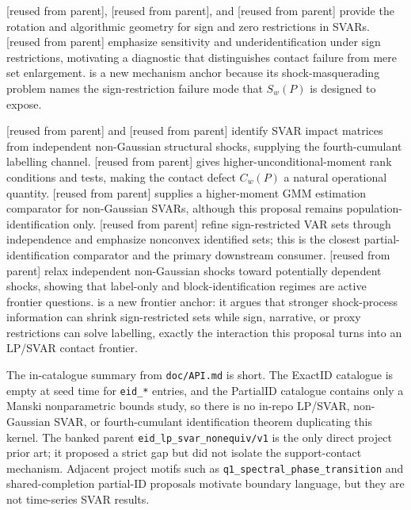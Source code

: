 \documentclass[11pt]{article}
\theoremstyle{definition}
\theoremstyle{plain}
\theoremstyle{remark}
\begin{document}
\citet{RubioRamirezWaggonerZha2010} [reused from parent], \citet{AriasRubioRamirezWaggoner2018} [reused from parent], and \citet{Read2022} [reused from parent] provide the rotation and algorithmic geometry for sign and zero restrictions in SVARs.  \citet{BaumeisterHamilton2015} [reused from parent] emphasize sensitivity and underidentification under sign restrictions, motivating a diagnostic that distinguishes contact failure from mere set enlargement.  \citet{Wolf2020} is a new mechanism anchor because its shock-masquerading problem names the sign-restriction failure mode that \(S_w(P)\) is designed to expose.

\citet{GourierouxMonfortRenne2017} [reused from parent] and \citet{LanneMeitzSaikkonen2017} [reused from parent] identify SVAR impact matrices from independent non-Gaussian structural shocks, supplying the fourth-cumulant labelling channel.  \citet{Guay2021} [reused from parent] gives higher-unconditional-moment rank conditions and tests, making the contact defect \(C_w(P)\) a natural operational quantity.  \citet{LanneLuoto2021} [reused from parent] supplies a higher-moment GMM estimation comparator for non-Gaussian SVARs, although this proposal remains population-identification only.  \citet{DrautzburgWright2023} [reused from parent] refine sign-restricted VAR sets through independence and emphasize nonconvex identified sets; this is the closest partial-identification comparator and the primary downstream consumer.  \citet{LanneLiuLuoto2026} [reused from parent] relax independent non-Gaussian shocks toward potentially dependent shocks, showing that label-only and block-identification regimes are active frontier questions.  \citet{CarrieroMarcellinoTornese2024} is a new frontier anchor: it argues that stronger shock-process information can shrink sign-restricted sets while sign, narrative, or proxy restrictions can solve labelling, exactly the interaction this proposal turns into an LP/SVAR contact frontier.

The in-catalogue summary from \texttt{doc/API.md} is short.  The ExactID catalogue is empty at seed time for \texttt{eid\_*} entries, and the PartialID catalogue contains only a Manski nonparametric bounds study, so there is no in-repo LP/SVAR, non-Gaussian SVAR, or fourth-cumulant identification theorem duplicating this kernel.  The banked parent \texttt{eid\_lp\_svar\_nonequiv/v1} is the only direct project prior art; it proposed a strict gap but did not isolate the support-contact mechanism.  Adjacent project motifs such as \texttt{q1\_spectral\_phase\_transition} and shared-completion partial-ID proposals motivate boundary language, but they are not time-series SVAR results.
\end{document}
